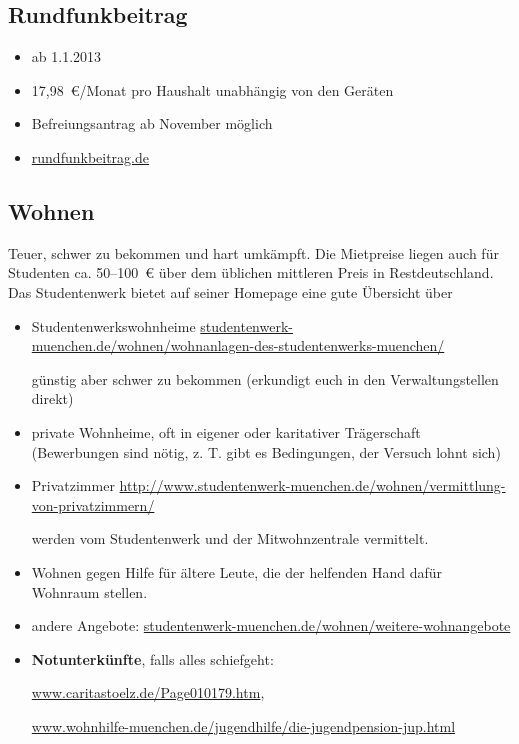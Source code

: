 \documentclass[twoside,12pt,parskip=half-]{scrartcl}
\begin{document}
\subsection{Rundfunkbeitrag}
\begin{itemize}
    \item ab 1.1.2013
    \item 17,98~€/Monat pro Haushalt unabhängig von den Geräten
    \item Befreiungsantrag ab November möglich
    \item \url{rundfunkbeitrag.de}
\end{itemize}

\subsection{Wohnen}
Teuer, schwer zu bekommen und hart umkämpft. Die Mietpreise liegen
auch für Studenten ca. 50--100~€ über dem üblichen mittleren Preis in
Restdeutschland. Das Studentenwerk bietet auf seiner Homepage eine
gute Übersicht über

\begin{itemize}
\item Studentenwerkswohnheime \newline \url{studentenwerk-muenchen.de/wohnen/wohnanlagen-des-studentenwerks-muenchen/}

  günstig aber schwer zu bekommen (erkundigt euch in den Verwaltungstellen direkt)
\item private Wohnheime, oft in eigener oder karitativer Trägerschaft
  (Bewerbungen sind nötig, z. T. gibt es Bedingungen, der Versuch lohnt sich)
\item
  Privatzimmer \newline \url{http://www.studentenwerk-muenchen.de/wohnen/vermittlung-von-privatzimmern/}
  
werden vom Studentenwerk und der Mitwohnzentrale vermittelt.
\item Wohnen gegen Hilfe für ältere Leute, die der helfenden Hand dafür
  Wohnraum stellen.
\item andere Angebote: \url{studentenwerk-muenchen.de/wohnen/weitere-wohnangebote}
\item {\bf Notunterkünfte}, falls alles schiefgeht:

 \url{www.caritastoelz.de/Page010179.htm},

  \url{www.wohnhilfe-muenchen.de/jugendhilfe/die-jugendpension-jup.html}
\end{itemize}
\end{document}
